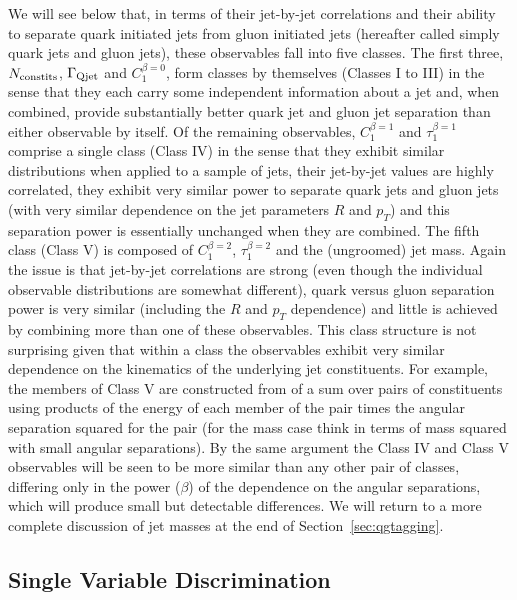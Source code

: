 We will see below that, in terms of their jet-by-jet correlations and their ability to separate quark initiated jets from gluon initiated
jets (hereafter called simply quark jets and gluon jets), these observables fall into five classes.  The first three, $N_{\rm constits}$, 
$\Gamma_{\rm Qjet}$ and $C_1^{\beta=0}$, form classes by themselves (Classes I to III) in the sense that they each carry some independent information 
about a jet and, when combined, provide substantially better quark jet and gluon jet separation than either observable by itself.  Of the remaining
observables, $C_1^{\beta=1}$ and $\tau_1^{\beta=1}$ comprise a single class (Class IV) in the sense that they exhibit similar 
distributions when applied to a sample of jets, their jet-by-jet values are highly correlated, they exhibit very similar power to separate 
quark jets and gluon jets (with very similar dependence on the jet parameters $R$ and $p_T$) and this separation power is essentially unchanged
when they are combined.  The fifth class (Class V) is composed of $C_1^{\beta=2}$, $\tau_1^{\beta=2}$ and the (ungroomed) jet mass.  Again the issue is that
jet-by-jet correlations are strong (even though the individual observable distributions are somewhat different), quark versus gluon separation power is very similar
(including the $R$ and $p_T$ dependence) and little is achieved by combining more than one of these observables.  This class structure is
not surprising given that within a class the observables exhibit very similar dependence on the kinematics of the underlying jet constituents.     
For example, the members of Class V are constructed from of a sum over pairs of constituents using products of the energy of each member 
of the pair times the angular separation squared for the pair (for the mass case think in terms of mass squared with small angular separations).  
By the same argument the Class IV and Class V observables will be seen to be more similar than any other pair of classes, differing only in the
power ($\beta$) of the dependence on the angular separations, which will produce small but detectable differences.  We will return to
 a more complete discussion of jet masses at the end of Section~\ref{sec:qgtagging}.


\subsection{Single Variable Discrimination}



